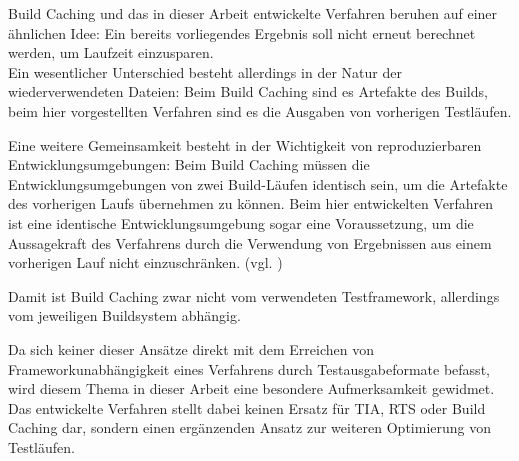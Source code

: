 Build Caching und das in dieser Arbeit entwickelte Verfahren beruhen auf einer ähnlichen Idee: Ein bereits vorliegendes Ergebnis soll nicht erneut berechnet werden, um Laufzeit einzusparen.\\
Ein wesentlicher Unterschied besteht allerdings in der Natur der wiederverwendeten Dateien: Beim Build Caching sind es Artefakte des Builds, beim hier vorgestellten Verfahren sind es die Ausgaben von vorherigen Testläufen. 

Eine weitere Gemeinsamkeit besteht in der Wichtigkeit von reproduzierbaren Entwicklungsumgebungen: Beim Build Caching müssen die Entwicklungsumgebungen von zwei Build-Läufen identisch sein, um die Artefakte des vorherigen Laufs übernehmen zu können. Beim hier entwickelten Verfahren ist eine identische Entwicklungsumgebung sogar eine Voraussetzung, um die Aussagekraft des Verfahrens durch die Verwendung von Ergebnissen aus einem vorherigen Lauf nicht einzuschränken. (vgl. \textcite[6-8]{zhengBC})

Damit ist Build Caching zwar nicht vom verwendeten Testframework, allerdings vom jeweiligen Buildsystem abhängig. 

Da sich keiner dieser Ansätze direkt mit dem Erreichen von Frameworkunabhängigkeit eines Verfahrens durch Testausgabeformate befasst, wird diesem Thema in dieser Arbeit eine besondere Aufmerksamkeit gewidmet.\\
Das entwickelte Verfahren stellt dabei keinen Ersatz für TIA, RTS oder Build Caching dar, sondern einen ergänzenden Ansatz zur weiteren Optimierung von Testläufen.

